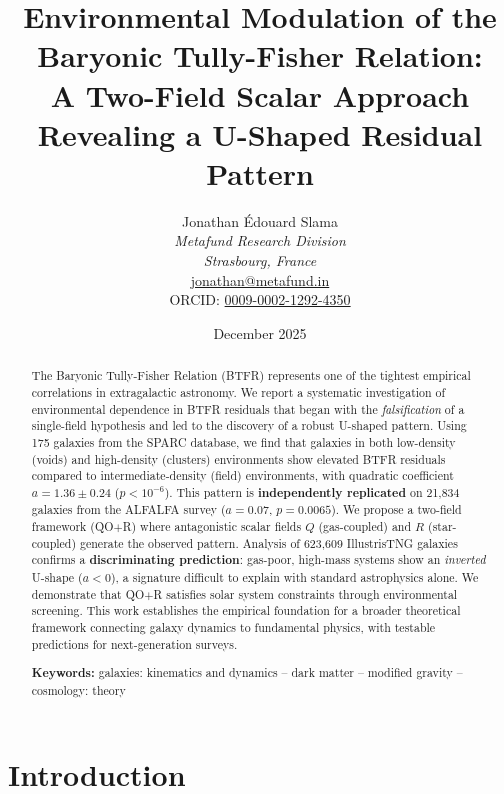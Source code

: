 \documentclass[12pt,a4paper]{article}
\title{
\vspace{-1cm}
\textbf{Environmental Modulation of the Baryonic Tully-Fisher Relation:\\
A Two-Field Scalar Approach Revealing a U-Shaped Residual Pattern}
}
\author{
Jonathan Édouard Slama\\[0.3cm]
\textit{Metafund Research Division}\\
\textit{Strasbourg, France}\\[0.2cm]
\href{mailto:jonathan@metafund.in}{jonathan@metafund.in}\\
ORCID: \href{https://orcid.org/0009-0002-1292-4350}{0009-0002-1292-4350}
}
\date{December 2025}
\newcommand{\QOR}{QO$+$R}
\begin{document}
\maketitle

\begin{abstract}

The Baryonic Tully-Fisher Relation (BTFR) represents one of the tightest empirical correlations in extragalactic astronomy. We report a systematic investigation of environmental dependence in BTFR residuals that began with the \textit{falsification} of a single-field hypothesis and led to the discovery of a robust U-shaped pattern. Using 175 galaxies from the SPARC database, we find that galaxies in both low-density (voids) and high-density (clusters) environments show elevated BTFR residuals compared to intermediate-density (field) environments, with quadratic coefficient $a = 1.36 \pm 0.24$ ($p < 10^{-6}$). This pattern is \textbf{independently replicated} on 21,834 galaxies from the ALFALFA survey ($a = 0.07$, $p = 0.0065$). We propose a two-field framework (\QOR{}) where antagonistic scalar fields $Q$ (gas-coupled) and $R$ (star-coupled) generate the observed pattern. Analysis of 623,609 IllustrisTNG galaxies confirms a \textbf{discriminating prediction}: gas-poor, high-mass systems show an \textit{inverted} U-shape ($a < 0$), a signature difficult to explain with standard astrophysics alone. We demonstrate that \QOR{} satisfies solar system constraints through environmental screening. This work establishes the empirical foundation for a broader theoretical framework connecting galaxy dynamics to fundamental physics, with testable predictions for next-generation surveys.

\vspace{0.3cm}
\noindent\textbf{Keywords:} galaxies: kinematics and dynamics -- dark matter -- modified gravity -- cosmology: theory
\end{abstract}

\newpage
\tableofcontents
\newpage

\section{Introduction}
\label{sec:introduction}
\end{document}
